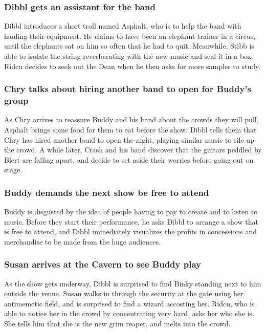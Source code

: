 \subsubsection{\Gls{Dibbl} gets an assistant for the band}
\Gls{Dibbl} introduces a short troll named \Gls{Asphalt}, who is to help the band with hauling their
equipment. He claims to have been an elephant trainer in a circus, until the elephants sat on him
so often that he had to quit. Meanwhile, \Gls{Stibb} is able to isolate the string reverberating
with the new music and seal it in a box. \Gls{Ridcu} decides to seek out the \Gls{Dean} when he
then asks for more samples to study.

\subsubsection{\Gls{Chry} talks about hiring another band to open for \Gls{Buddy}'s group}
As \Gls{Chry} arrives to reassure \Gls{Buddy} and his band about the crowds they will pull,
\Gls{Asphalt} brings some food for them to eat before the show. \Gls{Dibbl} tells them that
\Gls{Chry} has hired another band to open the night, playing similar music to rile up the crowd.
A while later, \Gls{Crash} and his band discover that the guitars peddled by \Gls{Blert} are
falling apart, and decide to set aside their worries before going out on stage.

\subsubsection{\Gls{Buddy} demands the next show be free to attend}
\Gls{Buddy} is disgusted by the idea of people having to pay to create and to listen to music.
Before they start their performance, he asks \Gls{Dibbl} to arrange a show that is free to attend,
and \Gls{Dibbl} immediately visualizes the profits in concessions and merchandise to be made from
the huge audiences.

\subsubsection{\Gls{Susan} arrives at the Cavern to see \Gls{Buddy} play}
As the show gets underway, \Gls{Dibbl} is surprised to find \Gls{Binky} standing next to him
outside the venue. \Gls{Susan} walks in through the security at the gate using her antimemetic
field, and is surprised to find a wizard accosting her. \Gls{Ridcu}, who is able to notice her
in the crowd by concentrating very hard, asks her who she is. She tells him that she is the new
grim reaper, and melts into the crowd.

